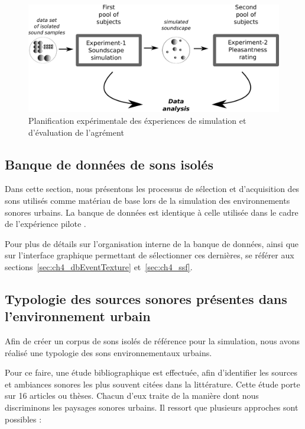 \begin{figure}[t]
        \myfloatalign
        \includegraphics[width=.8\linewidth]{gfx/5}
        \caption{Planification expérimentale des éxperiences de simulation et d'évaluation de l'agrément}\label{fig:xp1_2}
\end{figure}



\subsection{Banque de données de sons isolés}

Dans cette section, nous présentons les processus de sélection et d'acquisition des sons utilisés comme matériau de base lors de la simulation des environnements sonores urbains. La banque de données est identique à celle utilisée dans le cadre de l'expérience pilote \citep{lafay2013atiam,lafay2014new}. 

Pour plus de détails sur l'organisation interne de la banque de données, ainsi que sur l'interface graphique permettant de sélectionner ces dernières, se référer aux sections~\ref{sec:ch4_dbEventTexture} et~\ref{sec:ch4_ssf}.

\subsection{Typologie des sources sonores présentes dans l'environnement urbain}

Afin de créer un corpus de sons isolés de référence pour la simulation, nous avons réalisé une typologie des sons environnementaux urbains. 

Pour ce faire, une étude bibliographique est effectuée, afin d'identifier les sources et ambiances sonores les plus souvent citées dans la littérature. Cette étude porte sur 16 articles ou thèses. Chacun d'eux traite de la manière dont nous discriminons les paysages sonores urbains. Il ressort que plusieurs approches sont possibles :

